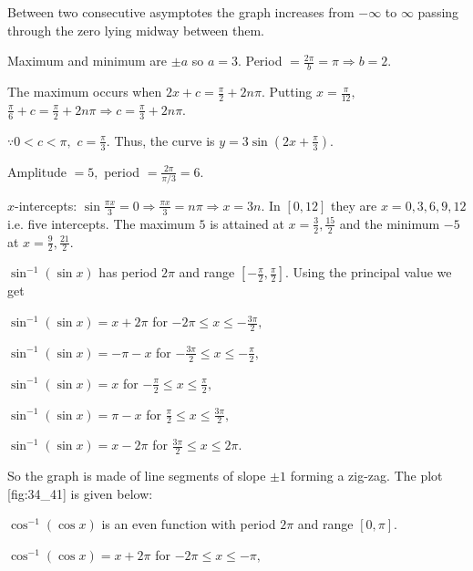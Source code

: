   Between two consecutive asymptotes the graph increases from $-\infty$ to $\infty$ passing through the zero lying
  midway between them.

\item Maximum and minimum are $\pm a$ so $a = 3.$ Period $= \frac{2\pi}{b} = \pi \Rightarrow b = 2.$

  The maximum occurs when $2x + c = \frac{\pi}{2} + 2n\pi.$ Putting $x = \frac{\pi}{12},$ $\frac{\pi}{6} + c =
  \frac{\pi}{2} + 2n\pi \Rightarrow c = \frac{\pi}{3} + 2n\pi.$

  $\because 0 < c < \pi,$ $c = \frac{\pi}{3}.$ Thus, the curve is $y = 3\sin\left(2x + \frac{\pi}{3}\right).$

\item Amplitude $= 5,$ period $= \frac{2\pi}{\pi/3} = 6.$

  $x$-intercepts: $\sin\frac{\pi x}{3} = 0 \Rightarrow \frac{\pi x}{3} = n\pi \Rightarrow x = 3n.$ In $[0, 12]$ they are
  $x = 0, 3, 6, 9, 12$ i.e. five intercepts. The maximum $5$ is attained at $x = \frac{3}{2}, \frac{15}{2}$ and the
  minimum $-5$ at $x = \frac{9}{2}, \frac{21}{2}.$

\item $\sin^{-1}(\sin x)$ has period $2\pi$ and range $\left[-\frac{\pi}{2}, \frac{\pi}{2}\right].$ Using the
  principal value we get

  $\sin^{-1}(\sin x) = x + 2\pi$ for $-2\pi\leq x\leq -\frac{3\pi}{2},$

  $\sin^{-1}(\sin x) = -\pi - x$ for $-\frac{3\pi}{2}\leq x\leq -\frac{\pi}{2},$

  $\sin^{-1}(\sin x) = x$ for $-\frac{\pi}{2}\leq x\leq \frac{\pi}{2},$

  $\sin^{-1}(\sin x) = \pi - x$ for $\frac{\pi}{2}\leq x\leq \frac{3\pi}{2},$

  $\sin^{-1}(\sin x) = x - 2\pi$ for $\frac{3\pi}{2}\leq x\leq 2\pi.$

  So the graph is made of line segments of slope $\pm1$ forming a zig-zag. The plot [fig:34_41] is given
  below:

  \startplacefigure[title={Plot of $\sin^{-1}(\sin x)$}, reference=fig:34_41]
    \externalfigure[34_41.pdf]
  \stopplacefigure

\item $\cos^{-1}(\cos x)$ is an even function with period $2\pi$ and range $[0, \pi].$

  $\cos^{-1}(\cos x) = x + 2\pi$ for $-2\pi\leq x\leq -\pi,$

